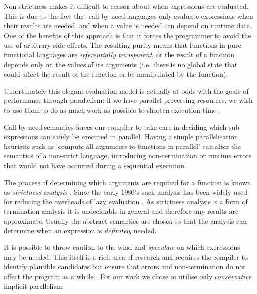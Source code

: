 Non-strictness makes it difficult to reason about when expressions are
evaluated. This is due to the fact that call-by-need languages only evaluate
expressions when their results are needed, and when a value is needed can
depend on runtime data. One of the benefits of this approach is that it forces
the programmer to avoid the use of arbitrary side-effects. The resulting purity
means that functions in pure functional languages are \emph{referentially
transparent}, or the result of a function depends only on the values of its
arguments (i.e.  there is no global state that could affect the result of the
function or be manipulated by the function).

Unfortunately this elegant evaluation model is actually at odds with the goals
of performance through parallelism: if we have parallel processing resources,
we wish to use them to do as much work as possible to shorten execution time
\citep{tremblay1995impact}.

Call-by-need semantics forces our compiler to take care in deciding which
sub-expressions can safely be executed in parallel. Having a simple
parallelisation heuristic such as `compute all arguments to functions in
parallel' can alter the semantics of a non-strict language, introducing
non-termination or runtime errors that would not have occurred during a
sequential execution.

The process of determining which arguments are required for a function is known
as \emph{strictness analysis} \citep{mycroft1980theory}. Since the early 1980's
such analysis has been widely used for reducing the overheads of lazy evaluation
\citep{SergeyDemand}. As strictness analysis is a form of termination analysis
it is undecidable in general and therefore any results are approximate. Usually
the abstract semantics are chosen so that the analysis can determine when
an expression is \emph{definitely} needed.

It is possible to throw caution to the wind and \emph{speculate} on which
expressions may be needed. This itself is a rich area of research and requires
the compiler to identify plausible candidates but ensure that errors and
non-termination do not affect the program as a whole . For our work we chose to utilise only \emph{conservative}
implicit parallelism.


